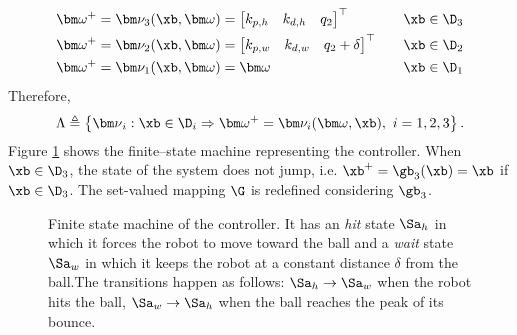 %
\begin{align*}
\bm\omega^+ = \bm\nu_{3}(\xb,\bm\omega) &=\begin{bmatrix}k_{p,h}&k_{d,h}&q_2\end{bmatrix}^\top &\quad&\xb\in\D_3\\
\bm\omega^+ = \bm\nu_{2}(\xb,\bm\omega) &=\begin{bmatrix}k_{p,w}&k_{d,w}&q_2 + \delta\end{bmatrix}^\top &\quad&\xb\in\D_2\\
\bm\omega^+ = \bm\nu_{1}(\xb,\bm\omega) &= \bm\omega &\quad&\xb\in\D_1
\end{align*}
%
Therefore,
%
\begin{equation}
    \Lambda \triangleq \left\{{\bm\nu}_i:\xb\in\D_i\Rightarrow \bm\omega^+ = \bm\nu_i(\bm\omega,\xb),~ i = 1,2,3\right\}.
\end{equation}
%
Figure \ref{fig:ctrl} shows the finite--state machine representing the controller.
When $\xb\in\D_3$, the state of the system does not jump, i.e. $\xb^+ = \gb_3(\xb)= \xb$ if $\xb\in\D_3$.
The set-valued mapping $\G$ is redefined considering $\gb_3$.
%
\begin{figure}[!ht]
	\centering
	\caption{Finite state machine of the controller. It has an \textit{hit} state $\Sa_h$ in which it forces the robot to move toward the ball and a \textit{wait} state $\Sa_w$ in which it keeps the robot at a constant distance $\delta$ from the ball.The transitions happen as follows: $\Sa_h\rightarrow\Sa_w$ when the robot hits the ball, $\Sa_w\rightarrow\Sa_h$ when the ball reaches the peak of its bounce.}
	\label{fig:ctrl}
\end{figure}
